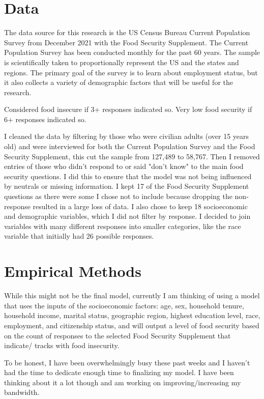 \documentclass[12pt,english]{article}
\begin{document}
\section{Data}\label{sec:data}
The data source for this research is the US Census Bureau Current Population Survey from December 2021 with the Food Security Supplement. The Current Population Survey has been conducted monthly for the past 60 years. The sample is scientifically taken to proportionally represent the US and the states and regions. The primary goal of the survey is to learn about employment status, but it also collects a variety of demographic factors that will be useful for the research. 

Considered food insecure if 3+ responses indicated so.
Very low food security if 6+ responses indicated so.

I cleaned the data by filtering by those who were civilian adults (over 15 years old) and were interviewed for both the Current Population Survey and the Food Security Supplement, this cut the sample from 127,489 to 58,767. Then I removed entries of those who didn't respond to or said "don't know" to the main food security questions. I did this to ensure that the model was not being influenced by neutrals or missing information. I kept 17 of the Food Security Supplement questions as there were some I chose not to include because dropping the non-response resulted in a large loss of data. I also chose to keep 18 socioeconomic and demographic variables, which I did not filter by response. I decided to join variables with many different responses into smaller categories, like the race variable that initially had 26 possible responses. 


\section{Empirical Methods}\label{sec:methods}

While this might not be the final model, currently I am thinking of using a model that uses the inputs of the socioeconomic factors: age, sex, household tenure, household income, marital status, geographic region, highest education level, race, employment, and citizenship status, and will output a level of food security based on the count of responses to the selected Food Security Supplement that indicate/ tracks with food insecurity. 

To be honest, I have been overwhelmingly busy these past weeks and I haven't had the time to dedicate enough time to finalizing my model. I have been thinking about it a lot though and am working on improving/increasing my bandwidth. 
\end{document}
